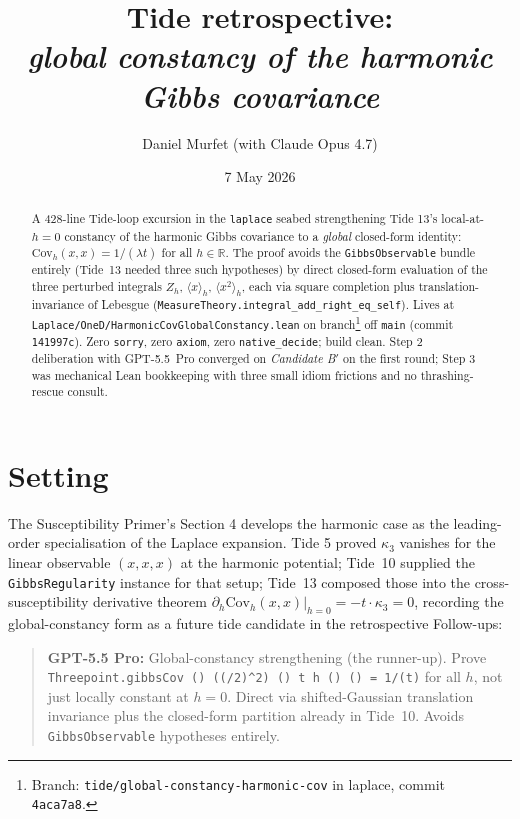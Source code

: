 \documentclass[11pt]{article}
\title{Tide retrospective:\\\emph{global constancy of the harmonic Gibbs covariance}}
\author{Daniel Murfet (with Claude Opus 4.7)}
\date{7 May 2026}
\newcommand{\gptbox}[1]{\par\medskip\begin{quote}\small\textbf{\textcolor{green!50!black}{GPT-5.5 Pro:}} #1\end{quote}\medskip}
\begin{document}
\sloppy
\maketitle

\begin{abstract}
A 428-line Tide-loop excursion in the \texttt{laplace} seabed
strengthening Tide 13's local-at-$h{=}0$ constancy of the harmonic
Gibbs covariance to a \emph{global} closed-form identity:
$\mathrm{Cov}_h(x,x) = 1/(\lambda t)$ for all $h \in \mathbb{R}$. The
proof avoids the \texttt{GibbsObservable} bundle entirely (Tide~13
needed three such hypotheses) by direct closed-form evaluation of the
three perturbed integrals $Z_h$, $\langle x \rangle_h$,
$\langle x^2 \rangle_h$, each via square completion plus
translation-invariance of Lebesgue
(\texttt{MeasureTheory.integral\_add\_right\_eq\_self}). Lives at
\texttt{Laplace/OneD/HarmonicCovGlobalConstancy.lean} on
branch\footnote{Branch:
\texttt{tide/global-constancy-harmonic-cov} in laplace, commit
\texttt{4aca7a8}.} off \texttt{main} (commit \texttt{141997c}). Zero
\texttt{sorry}, zero \texttt{axiom}, zero \texttt{native\_decide};
build clean. Step 2 deliberation with GPT-5.5~Pro converged on
\emph{Candidate B$'$} on the first round; Step 3 was mechanical Lean
bookkeeping with three small idiom frictions and no thrashing-rescue
consult.
\end{abstract}

\section{Setting}

The Susceptibility Primer's Section 4 develops the harmonic case as
the leading-order specialisation of the Laplace expansion. Tide 5
proved $\kappa_3$ vanishes for the linear observable $(x,x,x)$ at the
harmonic potential; Tide~10 supplied the \texttt{GibbsRegularity}
instance for that setup; Tide~13 composed those into the
cross-susceptibility derivative theorem
$\partial_h \mathrm{Cov}_h(x,x)|_{h=0} = -t \cdot \kappa_3 = 0$,
recording the global-constancy form as a future tide candidate in the
retrospective Follow-ups:

\gptbox{Global-constancy strengthening (the runner-up). Prove
\texttt{Threepoint.gibbsCov\,(\mathrm{volume})\,((\lambda/2)\cdot^2)\,(\mathrm{id})\,t\,h\,(\mathrm{id})\,(\mathrm{id})\,=\,1/(\lambda t)}
for all $h$, not just locally constant at $h = 0$. Direct via
shifted-Gaussian translation invariance plus the closed-form
partition already in Tide~10. Avoids \texttt{GibbsObservable}
hypotheses entirely.}
\end{document}
